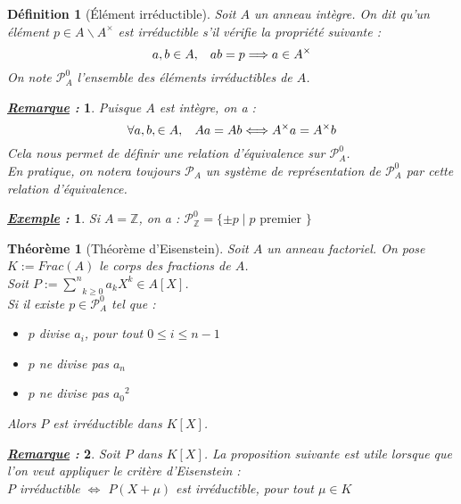 \documentclass{article}           %
\newcommand\Z{\mathbb{Z}}
\newcommand\set[1]{\mathbb{#1}} 				%
\newcommand\cali[1]{\mathcal{#1}} 				%
\newcommand\summ[2]{\underset{#1}{\overset{#2}{\sum}}} 		%
\newcommand\tq{\hspace{0.3cm}} 		%
\newcommand\noset[1]{\backslash{#1}} 	%
\theoremstyle{break}
\theoremstyle{add}
\theoremstyle{break} %
\newtheorem{theoreme}{Théorème}[section]
\newtheorem{definition}{Définition}[section]
\theoremstyle{add}
\newtheorem*{exemple}{\textit{\underline{Exemple} :}}
\newtheorem*{remarque}{\textit{\underline{Remarque} : }}
\newcommand\NL{
\mbox{}
\vspace*{-\parsep}
\vspace*{-\baselineskip}}
\begin{document}
\begin{definition}[Élément irréductible]
Soit $A$ un anneau intègre. On dit qu'un élément $p \in A\noset{A^{\times}}$ est irréductible s'il vérifie la propriété suivante :
$$ a,b \in A, \tq ab=p \Longrightarrow a  \in A^{\times} $$ 
On note $\cali{P}_A^0$ l'ensemble des éléments irréductibles de $A$.
\end{definition}

\begin{remarque}
Puisque $A$ est intègre, on a :
$$ \forall a,b, \in A,  \tq Aa = Ab \Longleftrightarrow A^{\times}a = A^{\times}b$$
Cela nous permet de définir une relation d'équivalence sur $\cali{P}_A^0$. \\
En pratique, on notera toujours $\cali{P}_A$ un système de représentation de  $\cali{P}_A^0$ par cette relation d'équivalence.
\end{remarque}


\begin{exemple}\NL
Si $A = \Z$, on a : $\cali{P}_\Z^0 = \{ \pm p \;|\; p \textrm{ premier } \}$
\end{exemple}

\begin{theoreme}[Théorème d'Eisenstein]
Soit $A$ un anneau factoriel. On pose $K := Frac(A)$ le corps des fractions de $A$. \\
Soit $P := \summ{k \geq 0}{n} a_kX^k \in A[X]$.\\

Si il existe $p \in \cali{P}_A^0$ tel que :
\begin{itemize}
\item $p$ divise $a_i$, pour tout $0 \leq i \leq n-1$ 
\item $p$ ne divise pas $a_n$
\item $p$ ne divise pas ${a_0}^2$
\end{itemize}
Alors $P$ est irréductible dans $K[X]$.
\end{theoreme}

\begin{remarque}
Soit $P$ dans $K[X]$. La proposition suivante est utile lorsque que l'on veut appliquer le critère d'Eisenstein : \\
$P$ irréductible $\Longleftrightarrow$ $P(X+\mu)$ est irréductible, pour tout $\mu \in K$
\end{remarque}
\end{document}
